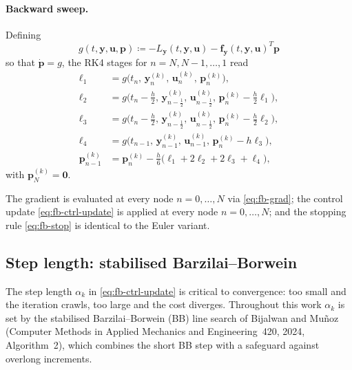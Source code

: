 \documentclass[a4paper, 10pt]{article}
\begin{document}
\paragraph{Backward sweep.} Defining
\begin{equation}
    g(t,\bm{y},\bm{u},\bm{p}) \coloneqq -L_{\bm{y}}(t,\bm{y},\bm{u}) - \bm{f}_{\bm{y}}(t,\bm{y},\bm{u})^{T}\bm{p}
\end{equation}
so that $\dot{\bm{p}} = g$, the RK4 stages for $n = N, N-1,\dots,1$ read
\begin{align}
    \bm{\ell}_1 &= g\bigl(t_n,\,\bm{y}_n^{(k)},\,\bm{u}_n^{(k)},\,\bm{p}_n^{(k)}\bigr), \\
    \bm{\ell}_2 &= g\bigl(t_n - \tfrac{h}{2},\,\bm{y}_{n-\tfrac12}^{(k)},\,\bm{u}_{n-\tfrac12}^{(k)},\,\bm{p}_n^{(k)} - \tfrac{h}{2}\bm{\ell}_1\bigr), \\
    \bm{\ell}_3 &= g\bigl(t_n - \tfrac{h}{2},\,\bm{y}_{n-\tfrac12}^{(k)},\,\bm{u}_{n-\tfrac12}^{(k)},\,\bm{p}_n^{(k)} - \tfrac{h}{2}\bm{\ell}_2\bigr), \\
    \bm{\ell}_4 &= g\bigl(t_{n-1},\,\bm{y}_{n-1}^{(k)},\,\bm{u}_{n-1}^{(k)},\,\bm{p}_n^{(k)} - h\bm{\ell}_3\bigr), \\
    \bm{p}_{n-1}^{(k)} &= \bm{p}_n^{(k)} - \tfrac{h}{6}\bigl(\bm{\ell}_1 + 2\bm{\ell}_2 + 2\bm{\ell}_3 + \bm{\ell}_4\bigr),
    \label{eq:fb-rk4-bwd}
\end{align}
with $\bm{p}_N^{(k)} = \bm{0}$.

The gradient is evaluated at every node $n = 0,\dots,N$ via
\eqref{eq:fb-grad}; the control update \eqref{eq:fb-ctrl-update} is
applied at every node $n = 0,\dots,N$; and the stopping rule
\eqref{eq:fb-stop} is identical to the Euler variant.

\subsection{Step length: stabilised Barzilai--Borwein}
\label{sec:fb-stabbb}

The step length $\alpha_k$ in \eqref{eq:fb-ctrl-update} is critical to
convergence: too small and the iteration crawls, too large and the cost
diverges. Throughout this work $\alpha_k$ is set by the stabilised
Barzilai--Borwein (BB) line search of Bijalwan and Mu\~noz (Computer
Methods in Applied Mechanics and Engineering~420, 2024, Algorithm~2),
which combines the short BB step with a safeguard against overlong
increments.
\end{document}
